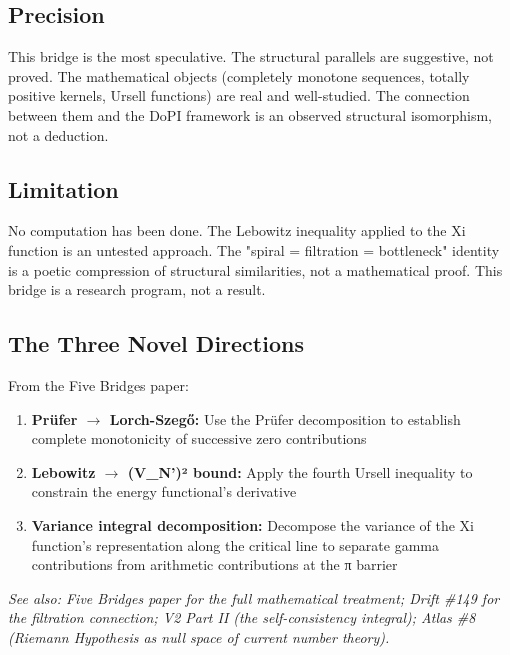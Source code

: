 \subsection*{Precision}


This bridge is the most speculative. The structural parallels are suggestive, not proved. The mathematical objects (completely monotone sequences, totally positive kernels, Ursell functions) are real and well-studied. The connection between them and the DoPI framework is an observed structural isomorphism, not a deduction.


\subsection*{Limitation}


No computation has been done. The Lebowitz inequality applied to the Xi function is an untested approach. The "spiral = filtration = bottleneck" identity is a poetic compression of structural similarities, not a mathematical proof. This bridge is a research program, not a result.


\subsection*{The Three Novel Directions}


From the Five Bridges paper:

\begin{enumerate}[nosep,leftmargin=*]
  \item \textbf{Prüfer $\rightarrow$ Lorch-Szegő:} Use the Prüfer decomposition to establish complete monotonicity of successive zero contributions
  \item \textbf{Lebowitz $\rightarrow$ (V\_N')² bound:} Apply the fourth Ursell inequality to constrain the energy functional's derivative
  \item \textbf{Variance integral decomposition:} Decompose the variance of the Xi function's representation along the critical line to separate gamma contributions from arithmetic contributions at the π barrier
\end{enumerate}


\textit{See also: Five Bridges paper for the full mathematical treatment; Drift \#149 for the filtration connection; V2 Part II (the self-consistency integral); Atlas \#8 (Riemann Hypothesis as null space of current number theory).}


\bigskip\noindent\makebox[\textwidth]{\color{rulegray}\rule{5cm}{0.3pt}}\bigskip


